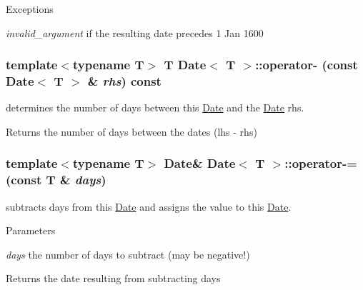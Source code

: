 \begin{DoxyExceptions}{Exceptions}
\item[{\em invalid\_\-argument}]if the resulting date precedes 1 Jan 1600 \end{DoxyExceptions}
\hypertarget{classDate_a3691ee1370123a8ba506785bf2573433}{
\subsubsection[{operator-\/}]{\setlength{\rightskip}{0pt plus 5cm}template$<$typename T$>$ T {\bf Date}$<$ T $>$::operator-\/ (const {\bf Date}$<$ T $>$ \& {\em rhs}) const}}
\label{classDate_a3691ee1370123a8ba506785bf2573433}
determines the number of days between this \hyperlink{classDate}{Date} and the \hyperlink{classDate}{Date} rhs. \begin{DoxyReturn}{Returns}
the number of days between the dates (lhs -\/ rhs) 
\end{DoxyReturn}
\hypertarget{classDate_ad1b53baf96121981070652e0fd1aaaa4}{
\subsubsection[{operator-\/=}]{\setlength{\rightskip}{0pt plus 5cm}template$<$typename T$>$ {\bf Date}\& {\bf Date}$<$ T $>$::operator-\/= (const T \& {\em days})}}
\label{classDate_ad1b53baf96121981070652e0fd1aaaa4}
subtracts days from this \hyperlink{classDate}{Date} and assigns the value to this \hyperlink{classDate}{Date}. 
\begin{DoxyParams}{Parameters}
\item[{\em days}]the number of days to subtract (may be negative!) \end{DoxyParams}
\begin{DoxyReturn}{Returns}
the date resulting from subtracting days 
\end{DoxyReturn}

